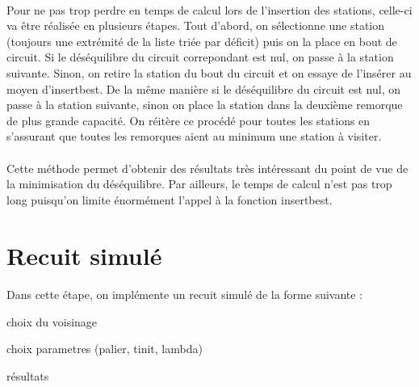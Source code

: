 \documentclass[a4paper, 11pt]{article} %
\begin{document}
\paragraph*{}
Pour ne pas trop perdre en temps de calcul lors de l'insertion des stations, celle-ci va être réalisée en plusieurs étapes. Tout d'abord, on sélectionne une station (toujours une extrémité de la liste triée par déficit) puis on la place en bout de circuit. Si le déséquilibre du circuit correpondant est nul, on passe à la station suivante. Sinon, on retire la station du bout du circuit et on essaye de l'insérer au moyen d'insertbest. De la même manière si le déséquilibre du circuit est nul, on passe à la station suivante, sinon on place la station dans la deuxième remorque de plus grande capacité. On réitère ce procédé pour toutes les stations en s'assurant que toutes les remorques aient au minimum une station à visiter.

\paragraph*{}
Cette méthode permet d'obtenir des résultats très intéressant du point de vue de la minimisation du déséquilibre. Par ailleurs, le temps de calcul n'est pas trop long puisqu'on limite énormément l'appel à la fonction insertbest.


\section{Recuit simulé}

\paragraph*{}
Dans cette étape, on implémente un recuit simulé de la forme suivante :


choix du voisinage

choix parametres (palier, tinit, lambda)

résultats
\end{document}
